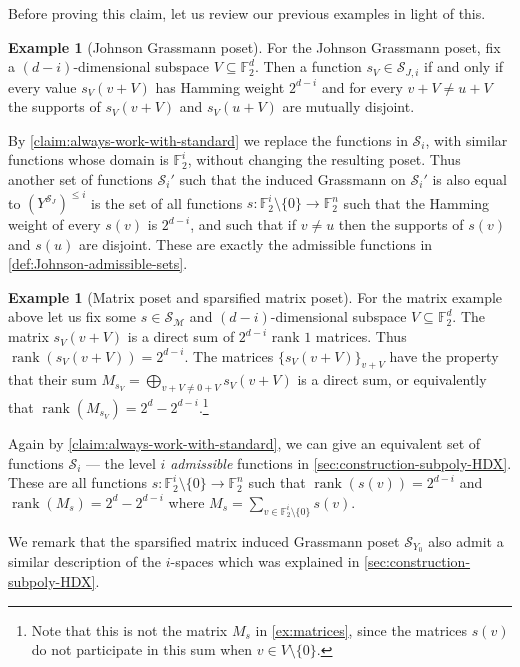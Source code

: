 \documentclass[10pt,a4paper]{article}
\newcommand{\prettyref}[1]{\cref{#1}}
\theoremstyle{definition}
\newtheorem{example}[theorem]{Example}
\theoremstyle{remark}
\newcommand{\Authornotecolored}[3]{{\sffamily\small\color{#1}{[#2: #3]}}}
\newcommand{\Authornotecolored}[3]{}
\newcommand{\Snote}{\Authornotecolored{Green}{S}}
\newcommand{\snote}{\Snote}
\newcommand{\set}[1]{\{#1\}}
\newcommand{\F}{\mathbb{F}}
\DeclareMathOperator{\rank}{rank}
\renewcommand{\leq}{\leqslant}
\numberwithin{equation}{section}
\let\pref=\prettyref
\def\MP{\mathcal{M}}
\begin{document}
Before proving this claim, let us review our previous examples in light of this.

\begin{example}[Johnson Grassmann poset] \label{ex:johnson-subspaces}
    For the Johnson Grassmann poset, fix a \((d-i)\)-dimensional subspace \(V \subseteq \F_2^d\). Then a function \(s_V \in \mathcal{S}_{J,i}\) if and only if every value \(s_V(v+V)\) has Hamming weight \(2^{d-i}\) and for every \(v+V \ne u+V\) the supports of \(s_V(v+V)\) and \(s_V(u+V)\) are mutually disjoint. 

    By \pref{claim:always-work-with-standard} we replace the functions in \(\mathcal{S}_i\), with similar functions whose domain is \(\F_2^i\), without changing the resulting poset. Thus another set of functions \(\mathcal{S}_i'\) such that the induced Grassmann on \(\mathcal{S}_i'\) is also equal to \((Y^{\mathcal{S}_J})^{\leq i}\) is the set of all functions \(s:\F_2^i \setminus \set{0} \to \F_2^n\) such that the Hamming weight of every \(s(v)\) is \(2^{d-i}\), and such that if \(v \ne u\) then the supports of \(s(v)\) and \(s(u)\) are disjoint. These are exactly the admissible functions in \pref{def:Johnson-admissible-sets}. %
\end{example}

\begin{example}[Matrix poset and sparsified matrix poset]
    For the matrix example above let us fix some \(s \in \mathcal{S}_{\MP}\) and \((d-i)\)-dimensional subspace \(V \subseteq \F_2^d\). The matrix \(s_V(v+V)\) is a direct sum of \(2^{d-i}\) rank \(1\) matrices. Thus \(\rank(s_V(v+V)) = 2^{d-i}\). The matrices \(\set{s_V(v+V)}_{v+V}\) have the property that their sum \(M_{s_V} = \bigoplus_{v+V \ne 0+V} s_V(v+V)\) is a direct sum, or equivalently that \(\rank(M_{s_V}) = 2^{d}-2^{d-i}\).\footnote{Note that this is not the matrix \(M_s\) in \pref{ex:matrices}, since the matrices \(s(v)\) do not participate in this sum when \(v \in V \setminus \set{0}\).}
    
    Again by \pref{claim:always-work-with-standard}, we can give an equivalent set of functions \(\mathcal{S}_i\) --- the level \(i\) \emph{admissible} functions in \pref{sec:construction-subpoly-HDX}. These are all functions \(s:\F_2^i \setminus \set{0} \to \F_2^n\) such that \(\rank(s(v)) = 2^{d-i}\) and \(\rank(M_s)=2^d - 2^{d-i}\) where \(M_s = \sum_{v \in \F_2^i \setminus \set{0}}s(v)\).
\end{example}
We remark that the sparsified matrix induced Grassmann poset \(\mathcal{S}_{Y_0}\) also admit a similar description of the \(i\)-spaces which was explained in \pref{sec:construction-subpoly-HDX}.
\end{document}
